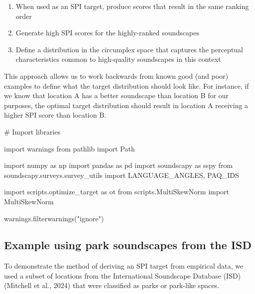 \documentclass[
  authoryear,
  preprint,
  3p]{elsarticle}
\newenvironment{Shaded}{\begin{snugshade}}{\end{snugshade}}
\newcommand{\CommentTok}[1]{\textcolor[rgb]{0.37,0.37,0.37}{#1}}
\newcommand{\ImportTok}[1]{\textcolor[rgb]{0.00,0.46,0.62}{#1}}
\newcommand{\NormalTok}[1]{\textcolor[rgb]{0.00,0.23,0.31}{#1}}
\newcommand{\StringTok}[1]{\textcolor[rgb]{0.13,0.47,0.30}{#1}}
\providecommand{\tightlist}{%
  \setlength{\itemsep}{0pt}\setlength{\parskip}{0pt}}\usepackage{longtable,booktabs,array}
\begin{document}
\begin{enumerate}
\def\labelenumi{\arabic{enumi}.}
\tightlist
\item
  When used as an SPI target, produce scores that result in the same
  ranking order
\item
  Generate high SPI scores for the highly-ranked soundscapes
\item
  Define a distribution in the circumplex space that captures the
  perceptual characteristics common to high-quality soundscapes in this
  context
\end{enumerate}

This approach allows us to work backwards from known good (and poor)
examples to define what the target distribution should look like. For
instance, if we know that location A has a better soundscape than
location B for our purposes, the optimal target distribution should
result in location A receiving a higher SPI score than location B.

\begin{Shaded}
\begin{Highlighting}[]
\CommentTok{\# Import libraries}

\ImportTok{import}\NormalTok{ warnings}
\ImportTok{from}\NormalTok{ pathlib }\ImportTok{import}\NormalTok{ Path}

\ImportTok{import}\NormalTok{ numpy }\ImportTok{as}\NormalTok{ np}
\ImportTok{import}\NormalTok{ pandas }\ImportTok{as}\NormalTok{ pd}
\ImportTok{import}\NormalTok{ soundscapy }\ImportTok{as}\NormalTok{ sspy}
\ImportTok{from}\NormalTok{ soundscapy.surveys.survey\_utils }\ImportTok{import}\NormalTok{ LANGUAGE\_ANGLES, PAQ\_IDS}

\ImportTok{import}\NormalTok{ scripts.optimize\_target }\ImportTok{as}\NormalTok{ ot}
\ImportTok{from}\NormalTok{ scripts.MultiSkewNorm }\ImportTok{import}\NormalTok{ MultiSkewNorm}

\NormalTok{warnings.filterwarnings(}\StringTok{"ignore"}\NormalTok{)}
\end{Highlighting}
\end{Shaded}

\subsection{Example using park soundscapes from the
ISD}\label{example-using-park-soundscapes-from-the-isd}

To demonstrate the method of deriving an SPI target from empirical data,
we used a subset of locations from the International Soundscape Database
(ISD) (Mitchell et al., 2024) that were classified as parks or park-like
spaces.
\end{document}
